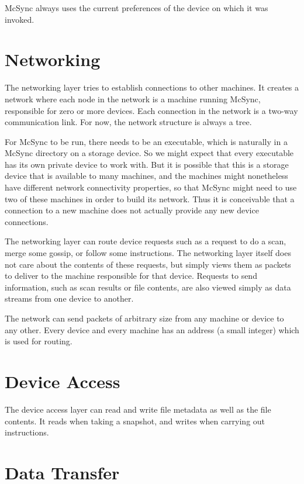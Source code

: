\documentclass{book}
\begin{document}
McSync always uses the current preferences of the device on which it was invoked.


\section{Networking}

The networking layer tries to establish connections to other machines.
It creates a network where each node in the network is a machine running McSync,
responsible for zero or more devices.
Each connection in the network is a two-way communication link.
For now, the network structure is always a tree.

For McSync to be run, there needs to be an executable,
which is naturally in a McSync directory on a storage device.
So we might expect that every executable has its own private device to work with.
But it is possible that this is a storage device that is available to many machines,
and the machines might nonetheless have different network connectivity properties,
so that McSync might need to use two of these machines in order to build its network.
Thus it is conceivable that a connection to a new machine does not actually provide
any new device connections.

The networking layer can route device requests such as a request to do a scan,
merge some gossip,
or follow some instructions.
The networking layer itself does not care about the contents of these requests,
but simply views them as packets to deliver to the machine responsible for that device.
Requests to send information, such as scan results or file contents,
are also viewed simply as data streams from one device to another.

The network can send packets of arbitrary size from any machine or device to any other.
Every device and every machine has an address (a small integer) which is used for routing.


\section{Device Access}

The device access layer can read and write file metadata as well as the file contents.
It reads when taking a snapshot,
and writes when carrying out instructions.


\section{Data Transfer}
\end{document}
